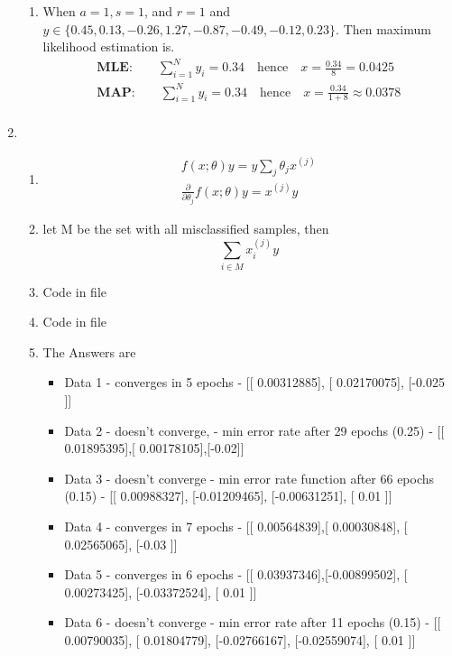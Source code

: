 \documentclass[a4paper]{article}
\begin{document}
\begin{enumerate}
\begin{enumerate}
	\item When $a = 1, s = 1$, and $r = 1$ and $y \in \{0.45, 0.13, -0.26, 1.27, -0.87, -0.49, -0.12, 0.23 \}$. Then maximum likelihood estimation is.
	\begin{gather*}
		\textbf{MLE:} \qquad \sum_{i=1}^N y_i = 0.34 \quad \text{hence} \quad x = \frac{0.34}{8} = \boxed{0.0425}\\
		\textbf{MAP:} \qquad \sum_{i=1}^N y_i = 0.34 \quad \text{hence} \quad x = \frac{0.34}{1 + 8} \approx \boxed{0.0378}  \\
	\end{gather*}
	\end{enumerate}
	\item 
	\begin{enumerate}
	\item 
	\begin{gather*}
		f(x;\theta)y = y\sum_j \theta_j x^{(j)}\\
		\boxed{\frac{\partial}{\partial \theta_j} f(x;\theta)y = x^{(j)}y}
	\end{gather*}
	\item let M be the set with all misclassified samples, then
	\begin{equation*}
		\boxed{\sum_{i \in M} x_i^{(j)} y}
	\end{equation*}
	\item Code in file
	\item Code in file
	\item The Answers are
	\begin{itemize}
		\item Data 1 - converges in 5 epochs - [[ 0.00312885], [ 0.02170075], [-0.025     ]]
		\item Data 2 - doesn't converge, - min error rate after 29 epochs (0.25) - [[ 0.01895395],[ 0.00178105],[-0.02]]
		\item Data 3 - doesn't converge - min error rate function after 66 epochs (0.15) - [[ 0.00988327], [-0.01209465], [-0.00631251], [ 0.01      ]]
		\item Data 4 - converges in 7 epochs - [[ 0.00564839],[ 0.00030848], [ 0.02565065], [-0.03      ]]
		\item Data 5 - converges in 6 epochs - [[ 0.03937346],[-0.00899502], [ 0.00273425], [-0.03372524], [ 0.01      ]]
		\item Data 6 - doesn't converge - min error rate after 11 epochs (0.15) - [[ 0.00790035], [ 0.01804779], [-0.02766167], [-0.02559074], [ 0.01      ]]
	\end{itemize}
	\end{enumerate}

\end{enumerate}
\end{document}
